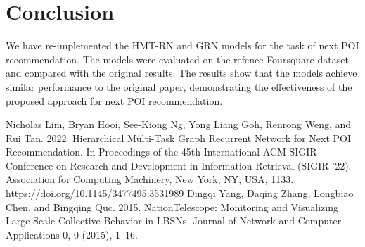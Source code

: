 \documentclass[twocolumn]{article}
\begin{document}
\section{Conclusion}
We have re-implemented the HMT-RN and GRN models for the task of 
next POI recommendation. The models were evaluated on the refence 
Foursquare dataset and compared with the original results. The 
results show that the models achieve similar performance to the
original paper, demonstrating the effectiveness of the proposed
approach for next POI recommendation.
\begin{thebibliography}{9}
Nicholas Lim, Bryan Hooi, See-Kiong Ng, Yong Liang Goh, Renrong Weng, and Rui Tan. 2022. Hierarchical Multi-Task Graph Recurrent Network for Next POI Recommendation. In Proceedings of the 45th International ACM SIGIR Conference on Research and Development in Information Retrieval (SIGIR '22). Association for Computing Machinery, New York, NY, USA, 1133. https://doi.org/10.1145/3477495.3531989
Dingqi Yang, Daqing Zhang, Longbiao Chen, and Bingqing Quc. 2015. NationTelescope: Monitoring and Visualizing Large-Scale Collective Behavior in LBSNs.
Journal of Network and Computer Applications 0, 0 (2015), 1–16.
\end{thebibliography}
\end{document}
